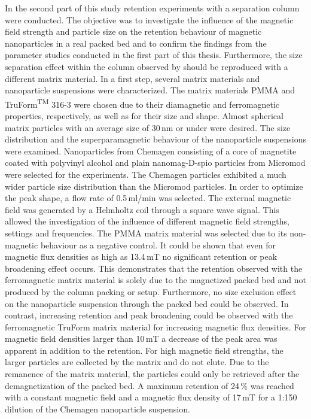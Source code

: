 In the second part of this study retention experiments with a separation column were conducted. The objective was to investigate the influence of the magnetic field strength and particle size on the retention behaviour of magnetic nanoparticles in a real packed bed and to confirm the findings from the parameter studies conducted in the first part of this thesis. Furthermore, the size separation effect within the column observed by \cite{AndreMaster} should be reproduced with a different matrix material. 
In a first step, several matrix materials and nanoparticle suspensions were characterized. The matrix materials PMMA and TruForm\textsuperscript{TM} 316-3  were chosen due to their diamagnetic and ferromagnetic properties, respectively, as well as for their size and shape. Almost spherical matrix particles with an average size of 30\,nm or under were desired. The size distribution and the superparamagnetic behaviour of the nanoparticle suspensions were examined. Nanoparticles from Chemagen consisting of a core of magnetite coated with polyvinyl alcohol and plain nanomag\textsuperscript{\textregistered}-D-spio particles from Micromod were selected for the experiments. The Chemagen particles exhibited a much wider particle size distribution than the Micromod particles. In order to optimize the peak shape, a flow rate of 0.5\,ml/min was selected. The external magnetic field was generated by a Helmholtz coil through a square wave signal. This allowed the investigation of the influence of different magnetic field strengths, settings and frequencies. The PMMA matrix material was selected due to its non-magnetic behaviour as a negative control. It could be shown that even for magnetic flux densities as high as 13.4\,mT no significant retention or peak broadening effect occurs. This demonstrates that the retention observed with the ferromagnetic matrix material is solely due to the magnetized packed bed and not produced by the column packing or setup. Furthermore, no size exclusion effect on the nanoparticle suspension through the packed bed could be observed. In contrast, increasing retention and peak broadening could be observed with the ferromagnetic TruForm matrix material for increasing magnetic flux densities. For magnetic field densities larger than 10\,mT a decrease of the peak area was apparent in addition to the retention. For high magnetic field strengths, the larger particles are collected by the matrix and do not elute. Due to the remanence of the matrix material, the particles could only be retrieved after the demagnetization of the packed bed. A maximum retention of 24\,\% was reached with a constant magnetic field and a magnetic flux density of 17\,mT for a 1:150 dilution of the Chemagen nanoparticle suspension.

